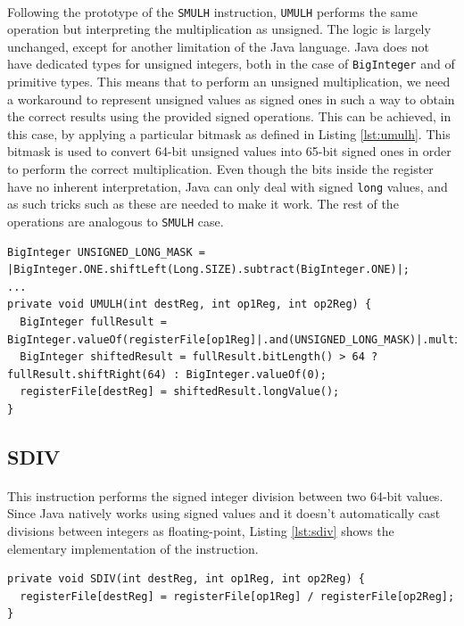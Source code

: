 \paragraph{}
Following the prototype of the \verb|SMULH| instruction, \verb|UMULH| performs the same operation but interpreting the multiplication as unsigned. The logic is largely unchanged, except for another limitation of the Java language. Java does not have dedicated types for unsigned integers, both in the case of \verb|BigInteger| and of primitive types. This means that to perform an unsigned multiplication, we need a workaround to represent unsigned values as signed ones in such a way to obtain the correct results using the provided signed operations. This can be achieved, in this case,  by applying a particular bitmask \cite{web:bitmask} as defined in Listing \ref{lst:umulh}. This bitmask is used to convert 64-bit unsigned values into 65-bit signed ones in order to perform the correct multiplication. Even though the bits inside the register have no inherent interpretation, Java can only deal with signed \verb|long| values, and as such tricks such as these are needed to make it work. The rest of the operations are analogous to \verb|SMULH| case.
\begin{lstlisting}[float, caption={Implementation of the UMULH instruction}, label={lst:umulh}]
BigInteger UNSIGNED_LONG_MASK = |BigInteger.ONE.shiftLeft(Long.SIZE).subtract(BigInteger.ONE)|;
...
private void UMULH(int destReg, int op1Reg, int op2Reg) {
  BigInteger fullResult = BigInteger.valueOf(registerFile[op1Reg]|.and(UNSIGNED_LONG_MASK)|.multiply(BigInteger.valueOf(registerFile[op2Reg])|.and(UNSIGNED_LONG_MASK)|);
  BigInteger shiftedResult = fullResult.bitLength() > 64 ? fullResult.shiftRight(64) : BigInteger.valueOf(0);
  registerFile[destReg] = shiftedResult.longValue();
}
\end{lstlisting}
\subsection{SDIV}
\paragraph{}
This instruction performs the signed integer division between two 64-bit values. Since Java natively works using signed values and it doesn't automatically cast divisions between integers as floating-point, Listing \ref{lst:sdiv} shows the elementary implementation of the instruction.
\begin{lstlisting}[float, caption={Implementation of the SDIV instruction}, label={lst:sdiv}]
private void SDIV(int destReg, int op1Reg, int op2Reg) {
  registerFile[destReg] = registerFile[op1Reg] / registerFile[op2Reg];
}
\end{lstlisting}
